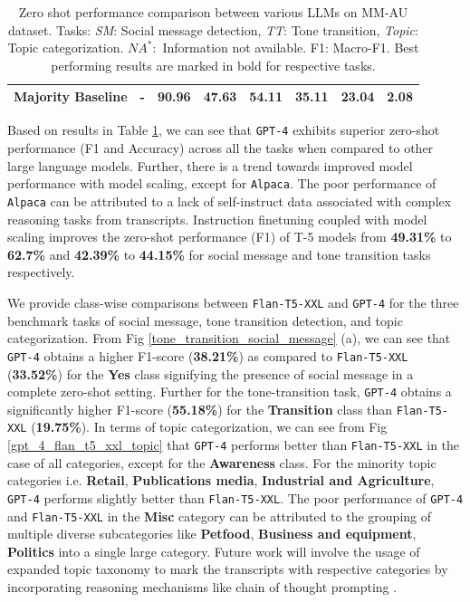 \begin{table}[h!]
{\begin{tabular}{|cc|cc|cc|cc|}
\multicolumn{1}{|c|}{Majority Baseline}      & \textbf{-}           & \multicolumn{1}{c|}{90.96}        & 47.63       & \multicolumn{1}{c|}{54.11}        & 35.11        & \multicolumn{1}{c|}{23.04}        & 2.08 \\ \hline
\end{tabular}
}
\caption{Zero shot performance comparison between various LLMs on MM-AU dataset.
Tasks: \textit{SM}: Social message detection, \textit{TT}: Tone transition, \textit{Topic}: Topic categorization. $NA^{*}:$  Information not available.  F1: Macro-F1. Best performing results are marked in bold for respective tasks.}
\label{llm}
\end{table} 

Based on results in Table \ref{llm}, we can see that \texttt{GPT-4} exhibits superior zero-shot performance (F1 and Accuracy) across all the tasks when compared to other large language models. Further, there is a trend towards improved model performance with model scaling, except for \texttt{Alpaca}. The poor performance of \texttt{Alpaca} can be attributed to a lack of self-instruct data associated with complex reasoning tasks from transcripts. Instruction finetuning coupled with model scaling improves the zero-shot performance (F1) of T-5 models from \textbf{49.31\%} to \textbf{62.7\%} and \textbf{42.39\%} to \textbf{44.15\%} for social message and tone transition tasks respectively.  
\par
We provide class-wise comparisons between \texttt{Flan-T5-XXL} and \texttt{GPT-4} for the three benchmark tasks of social message, tone transition detection, and topic categorization. From Fig \ref{tone_transition_social_message} (a), we can see that \texttt{GPT-4} obtains a higher F1-score (\textbf{38.21\%}) as compared to \texttt{Flan-T5-XXL} (\textbf{33.52\%}) for the \textbf{Yes} class signifying the presence of social message in a complete zero-shot setting. Further for the tone-transition task, \texttt{GPT-4} obtains a significantly higher F1-score (\textbf{55.18\%}) for the \textbf{Transition} class than \texttt{Flan-T5-XXL} (\textbf{19.75\%}). In terms of topic categorization, we can see from Fig \ref{gpt_4_flan_t5_xxl_topic} that \texttt{GPT-4} performs better than \texttt{Flan-T5-XXL} in the case of all categories, except for the \textbf{Awareness} class.  For the minority topic categories i.e. \textbf{Retail}, \textbf{Publications media}, \textbf{Industrial and Agriculture}, \texttt{GPT-4} performs slightly better than \texttt{Flan-T5-XXL}. The poor performance of \texttt{GPT-4} and \texttt{Flan-T5-XXL} in the \textbf{Misc} category can be attributed to the grouping of multiple diverse subcategories like \textbf{Petfood}, \textbf{Business and equipment}, \textbf{Politics} into a single large category. Future work will involve the usage of expanded topic taxonomy to mark the transcripts with respective categories by incorporating reasoning mechanisms like chain of thought prompting \cite{Wei2022ChainOT}.

